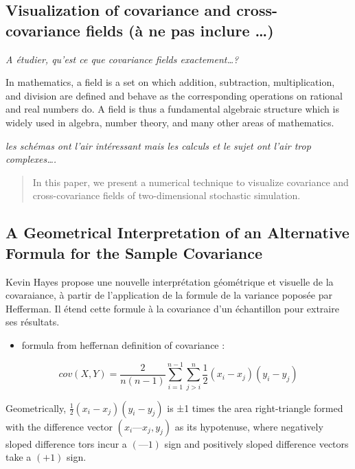 \documentclass[
]{report}
\providecommand{\tightlist}{%
  \setlength{\itemsep}{0pt}\setlength{\parskip}{0pt}}
\begin{document}
\hypertarget{visualization-of-covariance-and-cross-covariance-fields-uxe0-ne-pas-inclure}{%
\subsection{Visualization of covariance and cross-covariance fields (à ne pas inclure \ldots)}\label{visualization-of-covariance-and-cross-covariance-fields-uxe0-ne-pas-inclure}}

\emph{A étudier, qu'est ce que covariance fields exactement\ldots? } \citep{fields}

In mathematics, a field is a set on which addition, subtraction, multiplication, and division are defined and behave as the corresponding operations on rational and real numbers do. A field is thus a fundamental algebraic structure which is widely used in algebra, number theory, and many other areas of mathematics.

\emph{les schémas ont l'air intéressant mais les calculs et le sujet ont l'air trop complexes\ldots.}

\begin{quote}
In this paper, we present a numerical technique to visualize covariance and cross-covariance fields of two-dimensional stochastic simulation.
\end{quote}

\hypertarget{a-geometrical-interpretation-of-an-alternative-formula-for-the-sample-covariance}{%
\subsection{A Geometrical Interpretation of an Alternative Formula for the Sample Covariance}\label{a-geometrical-interpretation-of-an-alternative-formula-for-the-sample-covariance}}

Kevin Hayes \citep{Hayes} propose une nouvelle interprétation géométrique et visuelle de la covaraiance, à partir de l'application de la formule de la variance poposée par Hefferman. Il étend cette formule à la covariance d'un échantillon pour extraire ses résultats.

\begin{itemize}
\tightlist
\item
  formula from heffernan definition of covariance :
\end{itemize}

\[cov(X,Y)= \frac{2}{n(n-1)}\sum_{i=1}^{n-1}\sum_{j>i}^{n}\frac{1}{2}(x_i-x_j)(y_i - y_j)\]

Geometrically, \(\frac{1}{2}(x_i-x_j)(y_i - y_j)\) is ±1 times the area right-triangle formed with the difference vector \((x_i — x_j, y_j)\) as its hypotenuse, where negatively sloped difference tors incur a \((—1)\) sign and positively sloped difference vectors take a \((+1)\) sign. \citep{Hayes}
\end{document}
